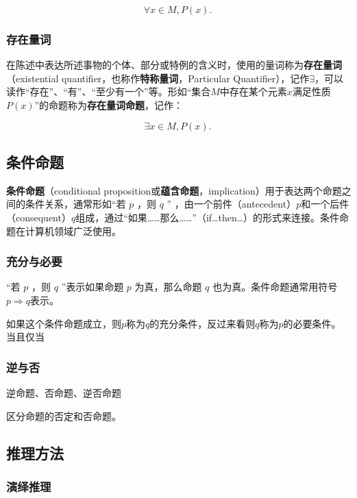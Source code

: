 \begin{equation}
\forall x\in M,P(x).~
\end{equation}

\subsubsection{存在量词}

在陈述中表达所述事物的个体、部分或特例的含义时，使用的量词称为\textbf{存在量词}（existential quantifier，也称作\textbf{特称量词}，Particular Quantifier），记作$\exists$，可以读作“存在”、“有”、“至少有一个”等。形如“集合$M$中存在某个元素$x$满足性质$P(x)$”的命题称为\textbf{存在量词命题}，记作：

\begin{equation}
\exists x\in M,P(x).~
\end{equation}

\subsection{条件命题}

\textbf{条件命题}（conditional proposition或\textbf{蕴含命题}，implication）用于表达两个命题之间的条件关系，通常形如“若 $p$ ，则 $q$ ” ，由一个前件（antecedent）$p$和一个后件（consequent）$q$组成，通过“如果……那么……”（if…then…）的形式来连接。条件命题在计算机领域广泛使用。




\subsubsection{充分与必要}

“若 $p$ ，则 $q$ ”表示如果命题 $p$ 为真，那么命题 $q$ 也为真。条件命题通常用符号$p\Rightarrow q$表示。

如果这个条件命题成立，则$p$称为$q$的充分条件，反过来看则$q$称为$p$的必要条件。
当且仅当

\subsubsection{逆与否}

逆命题、否命题、逆否命题

区分命题的否定和否命题。


\subsection{推理方法}

\subsubsection{演绎推理}

